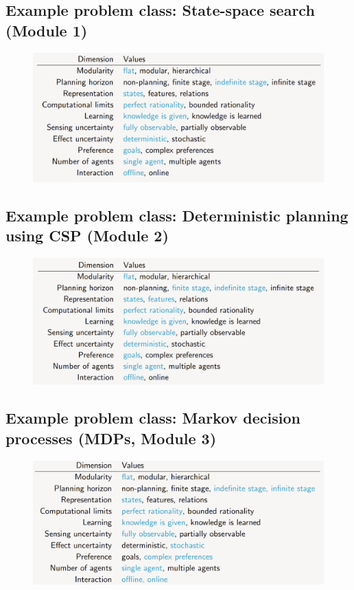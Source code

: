\documentclass[12pt]{article}
\begin{document}
\subsection{Example problem class: State-space search (Module 1)}

\begin{figure}[h!]
        \centering
        \includegraphics[scale=0.4]{module-1.png}
        \caption{}
        \label{fig:my_label}
\end{figure}

\newpage
\subsection{Example problem class: Deterministic planning using CSP (Module 2)}

\begin{figure}[h!]
        \centering
        \includegraphics[scale=0.4]{module-2.png}
        \caption{}
        \label{fig:my_label}
\end{figure}

\subsection{Example problem class: Markov decision processes (MDPs, Module 3)}

\begin{figure}[h!]
        \centering
        \includegraphics[scale=0.4]{module-3.png}
        \caption{}
        \label{fig:my_label}
\end{figure}
\end{document}
